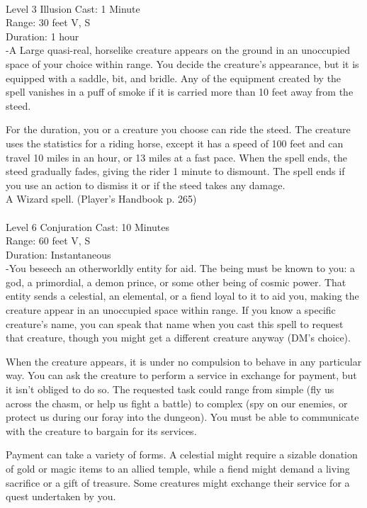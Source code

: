 \documentclass[10pt,twocolumn]{report}
\begin{document}
 \\
Level 3 \quad Illusion \quad Cast: 1 Minute\\
Range: 30 feet \quad V, S\\
Duration: 1 hour \quad \\
-A Large quasi-real, horselike creature appears on the ground in an unoccupied space of your choice within range. You decide the creature’s appearance, but it is equipped with a saddle, bit, and bridle. Any of the equipment created by the spell vanishes in a puff of smoke if it is carried more than 10 feet away from the steed.

For the duration, you or a creature you choose can ride the steed. The creature uses the statistics for a riding horse, except it has a speed of 100 feet and can travel 10 miles in an hour, or 13 miles at a fast pace. When the spell ends, the steed gradually fades, giving the rider 1 minute to dismount. The spell ends if you use an action to dismiss it or if the steed takes any damage.\\
A Wizard spell. (Player's Handbook p. 265) \\


 \\
Level 6 \quad Conjuration \quad Cast: 10 Minutes\\
Range: 60 feet \quad V, S\\
Duration: Instantaneous \quad \\
-You beseech an otherworldly entity for aid.
The being must be known to you: a god, a primordial, a demon prince, or some other being of cosmic power. That entity sends a celestial, an elemental, or a fiend loyal to it to aid you, making the creature appear in an unoccupied space within range. If you know a specific creature’s name, you can speak that name when you cast this spell to request that creature, though you might get a different creature anyway (DM’s choice).

When the creature appears, it is under no compulsion to behave in any particular way. You can ask the creature to perform a service in exchange for payment, but it isn’t obliged to do so. The requested task could range from simple (fly us across the chasm, or help us fight a battle) to complex (spy on our enemies, or protect us during our foray into the dungeon). You must be able to communicate with the creature to bargain for its services.

Payment can take a variety of forms. A celestial might require a sizable donation of gold or magic items to an allied temple, while a fiend might demand a living sacrifice or a gift of treasure. Some creatures might exchange their service for a quest undertaken by you.
\end{document}
